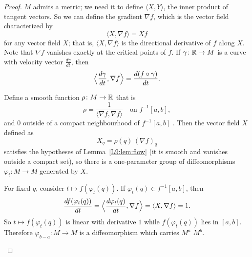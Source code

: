 \begin{proof}
$M$ admits a  metric; we need it to define $\langle X,Y\rangle$, the inner product
of tangent vectors. So we can define the gradient $\nabla f$, which is the vector field
characterized by
\[
  \langle X,\nabla f\rangle = Xf
\]
for any vector field $X$; that is, $\langle X,\nabla f\rangle$ is the directional derivative of $f$
along $X$. Note that $\nabla f$ vanishes exactly at the critical points of $f$.
If $\gamma\colon\mathbb{R}\to M$ is a curve with velocity vector $\frac{d\gamma}{dt}$, then
\[
  \Bigl\langle\frac{d\gamma}{dt},\nabla f\Bigr\rangle=\frac{d(f\circ\gamma)}{dt}.
\]

Define a smooth function $\rho\colon M\to\mathbb{R}$ that is
\[
  \rho=\frac{1}{\langle\nabla f,\nabla f\rangle}\quad\text{on } f^{-1}[a,b],
\]
and $0$ outside of a compact neighbourhood of $f^{-1}[a,b]$
.
Then the vector field $X$ defined as
\[
  X_q=\rho(q)\,(\nabla f)_q
\]
satisfies the hypotheses of Lemma~\ref{L9:lem:flow} (it is smooth and vanishes outside a compact
set), so there is a one-parameter group of diffeomorphisms $\varphi_t\colon M\to M$ generated by $X$.

For fixed $q$, consider $t\mapsto f(\varphi_t(q))$. If $\varphi_t(q)\in f^{-1}[a,b]$, then
\[
  \frac{d f(\varphi_t(q))}{dt}=\Bigl\langle\frac{d\varphi_t(q)}{dt},\nabla f\Bigr\rangle
  =\langle X,\nabla f\rangle = 1 .
\]
So $t\mapsto f(\varphi_t(q))$ is linear with derivative $1$ while $f(\varphi_t(q))$ lies in $[a,b]$.
Therefore $\varphi_{b-a}\colon M\to M$ is a diffeomorphism which carries $M^a$
 $M^b$.

\begin{center}
\end{center}


\end{proof}
